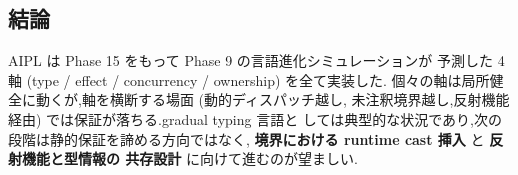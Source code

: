 \documentclass[11pt,a4paper]{article}
\begin{document}
\subsection{結論}

AIPL は Phase 15 をもって Phase 9 の言語進化シミュレーションが
予測した 4 軸 (type / effect / concurrency / ownership) を全て実装した.
個々の軸は局所健全に動くが,軸を横断する場面 (動的ディスパッチ越し,
未注釈境界越し,反射機能経由) では保証が落ちる.gradual typing 言語と
しては典型的な状況であり,次の段階は静的保証を諦める方向ではなく,
\textbf{境界における runtime cast 挿入} と \textbf{反射機能と型情報の
共存設計} に向けて進むのが望ましい.
\end{document}
